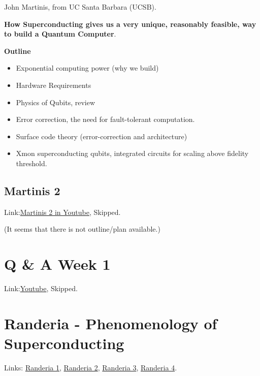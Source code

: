 \documentclass{article}
\begin{document}
    John Martinis, from UC Santa Barbara (UCSB).

    \textbf{How Superconducting gives us a very unique, reasonably
    feasible, way to build a Quantum Computer}.

    \textbf{Outline}
    \begin{itemize}
        \item Exponential computing power (why we build)
        \item Hardware Requirements
        \item Physics of Qubits, review
        \item Error correction, the need for fault-tolerant
            computation.
        \item Surface code theory (error-correction and architecture)
        \item Xmon superconducting qubits, integrated circuits for
            scaling above fidelity threshold.
    \end{itemize}

    \subsection{Martinis 2}
    \label{sec:Martinis 2}
    Link:\href{https://www.youtube.com/watch?v=nNeXqsVegUk&list=PL8mMEmoXNBfajJ15HO5G-PZW_0yWGWBdh&index=6}{Martinis 2 in Youtube}, Skipped.
    
    (It seems that there is not outline/plan available.)

\section{Q \& A Week 1}
\label{sec:QA Week 1}
Link:\href{https://www.youtube.com/watch?v=hsPTifCGgoE&list=PL8mMEmoXNBfajJ15HO5G-PZW_0yWGWBdh&index=7}{Youtube}, Skipped.

\section{Randeria - Phenomenology of Superconducting}
\label{sec:Randeria}
Links:
\href{https://www.youtube.com/watch?v=bQ8mB9kTcMY&index=8&list=PL8mMEmoXNBfajJ15HO5G-PZW_0yWGWBdh}{Randeria 1},
\href{https://www.youtube.com/watch?v=YTJE6-XZkKY&list=PL8mMEmoXNBfajJ15HO5G-PZW_0yWGWBdh&index=9}{Randeria 2},
\href{https://www.youtube.com/watch?v=i_nlB9_ZFMQ&list=PL8mMEmoXNBfajJ15HO5G-PZW_0yWGWBdh&index=10}{Randeria 3},
\href{https://www.youtube.com/watch?v=6xSWAL54ZhM&list=PL8mMEmoXNBfajJ15HO5G-PZW_0yWGWBdh&index=11}{Randeria 4}.
\end{document}
